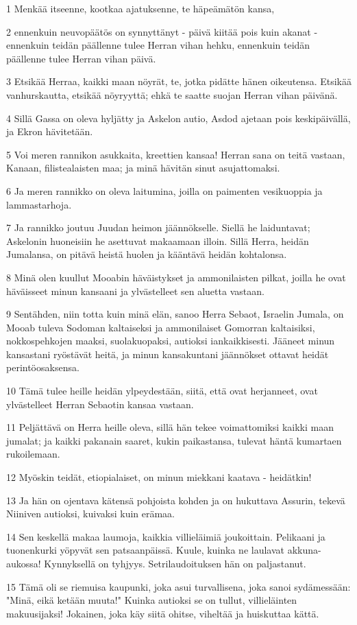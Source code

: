 \par 1 Menkää itseenne, kootkaa ajatuksenne, te häpeämätön kansa,
\par 2 ennenkuin neuvopäätös on synnyttänyt - päivä kiitää pois kuin akanat - ennenkuin teidän päällenne tulee Herran vihan hehku, ennenkuin teidän päällenne tulee Herran vihan päivä.
\par 3 Etsikää Herraa, kaikki maan nöyrät, te, jotka pidätte hänen oikeutensa. Etsikää vanhurskautta, etsikää nöyryyttä; ehkä te saatte suojan Herran vihan päivänä.
\par 4 Sillä Gassa on oleva hyljätty ja Askelon autio, Asdod ajetaan pois keskipäivällä, ja Ekron hävitetään.
\par 5 Voi meren rannikon asukkaita, kreettien kansaa! Herran sana on teitä vastaan, Kanaan, filistealaisten maa; ja minä hävitän sinut asujattomaksi.
\par 6 Ja meren rannikko on oleva laitumina, joilla on paimenten vesikuoppia ja lammastarhoja.
\par 7 Ja rannikko joutuu Juudan heimon jäännökselle. Siellä he laiduntavat; Askelonin huoneisiin he asettuvat makaamaan illoin. Sillä Herra, heidän Jumalansa, on pitävä heistä huolen ja kääntävä heidän kohtalonsa.
\par 8 Minä olen kuullut Mooabin häväistykset ja ammonilaisten pilkat, joilla he ovat häväisseet minun kansaani ja ylvästelleet sen aluetta vastaan.
\par 9 Sentähden, niin totta kuin minä elän, sanoo Herra Sebaot, Israelin Jumala, on Mooab tuleva Sodoman kaltaiseksi ja ammonilaiset Gomorran kaltaisiksi, nokkospehkojen maaksi, suolakuopaksi, autioksi iankaikkisesti. Jääneet minun kansastani ryöstävät heitä, ja minun kansakuntani jäännökset ottavat heidät perintöosaksensa.
\par 10 Tämä tulee heille heidän ylpeydestään, siitä, että ovat herjanneet, ovat ylvästelleet Herran Sebaotin kansaa vastaan.
\par 11 Peljättävä on Herra heille oleva, sillä hän tekee voimattomiksi kaikki maan jumalat; ja kaikki pakanain saaret, kukin paikastansa, tulevat häntä kumartaen rukoilemaan.
\par 12 Myöskin teidät, etiopialaiset, on minun miekkani kaatava - heidätkin!
\par 13 Ja hän on ojentava kätensä pohjoista kohden ja on hukuttava Assurin, tekevä Niiniven autioksi, kuivaksi kuin erämaa.
\par 14 Sen keskellä makaa laumoja, kaikkia villieläimiä joukoittain. Pelikaani ja tuonenkurki yöpyvät sen patsaanpäissä. Kuule, kuinka ne laulavat akkuna-aukossa! Kynnyksellä on tyhjyys. Setrilaudoituksen hän on paljastanut.
\par 15 Tämä oli se riemuisa kaupunki, joka asui turvallisena, joka sanoi sydämessään: "Minä, eikä ketään muuta!" Kuinka autioksi se on tullut, villieläinten makuusijaksi! Jokainen, joka käy siitä ohitse, viheltää ja huiskuttaa kättä.

